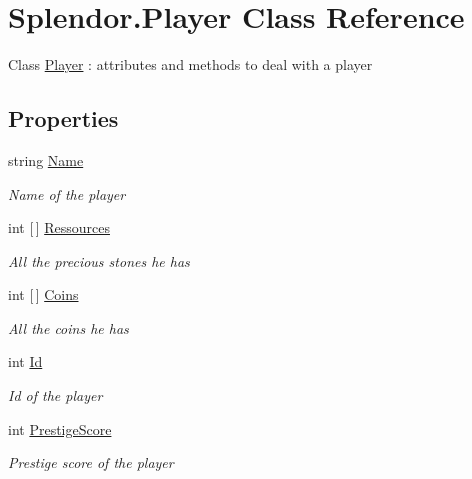 \hypertarget{class_splendor_1_1_player}{}\section{Splendor.\+Player Class Reference}
\label{class_splendor_1_1_player}


Class \hyperlink{class_splendor_1_1_player}{Player} \+: attributes and methods to deal with a player  


\subsection*{Properties}
\begin{DoxyCompactItemize}
\item 
string \hyperlink{class_splendor_1_1_player_a15abd489e523e11b6beb4b186783e47f}{Name}
\begin{DoxyCompactList}\small\item\em Name of the player \end{DoxyCompactList}\item 
int \mbox{[}$\,$\mbox{]} \hyperlink{class_splendor_1_1_player_a1c5ccd2470e3bbc84e9a156bc323bfd0}{Ressources}
\begin{DoxyCompactList}\small\item\em All the precious stones he has \end{DoxyCompactList}\item 
int \mbox{[}$\,$\mbox{]} \hyperlink{class_splendor_1_1_player_a729fa09f28e378e7934f3ae54ea463e9}{Coins}
\begin{DoxyCompactList}\small\item\em All the coins he has \end{DoxyCompactList}\item 
int \hyperlink{class_splendor_1_1_player_a5616e3562be3e8800f9e959e7cf75194}{Id}
\begin{DoxyCompactList}\small\item\em Id of the player \end{DoxyCompactList}\item 
int \hyperlink{class_splendor_1_1_player_a25f353959c735ce45d643d6cf614b157}{Prestige\+Score}
\begin{DoxyCompactList}\small\item\em Prestige score of the player \end{DoxyCompactList}\end{DoxyCompactItemize}


